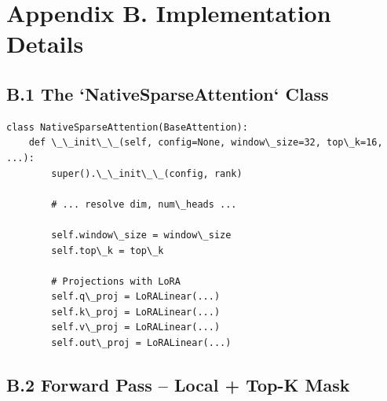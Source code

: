 
\section{Appendix B. Implementation Details}

\subsection{B.1 The `NativeSparseAttention` Class}

\begin{lstlisting}
class NativeSparseAttention(BaseAttention):
    def \_\_init\_\_(self, config=None, window\_size=32, top\_k=16, ...):
        super().\_\_init\_\_(config, rank)
        
        # ... resolve dim, num\_heads ...
        
        self.window\_size = window\_size
        self.top\_k = top\_k
        
        # Projections with LoRA
        self.q\_proj = LoRALinear(...)
        self.k\_proj = LoRALinear(...)
        self.v\_proj = LoRALinear(...)
        self.out\_proj = LoRALinear(...)
\end{lstlisting}

\subsection{B.2 Forward Pass -- Local + Top-K Mask}

